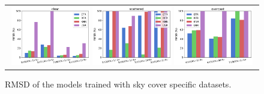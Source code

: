 \begin{figure} [hbtp]
\begin{center}
\begin{tabular}{c}
\includegraphics[width=0.32\textwidth]{img/results_clear.png}
\includegraphics[width=0.32\textwidth]{img/results_scattered.png}
\includegraphics[width=0.32\textwidth]{img/results_overcast.png}
\end{tabular}
\end{center}
\caption[error_skies] { \label{fig:error_skies}RMSD of the models trained with sky cover specific datasets.}
\end{figure}

